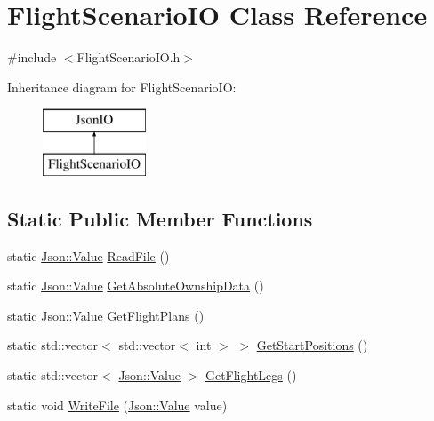\hypertarget{class_flight_scenario_i_o}{}\section{Flight\+Scenario\+IO Class Reference}
\label{class_flight_scenario_i_o}


{\ttfamily \#include $<$Flight\+Scenario\+I\+O.\+h$>$}

Inheritance diagram for Flight\+Scenario\+IO\+:\begin{figure}[H]
\begin{center}
\leavevmode
\includegraphics[height=2.000000cm]{class_flight_scenario_i_o}
\end{center}
\end{figure}
\subsection*{Static Public Member Functions}
\begin{DoxyCompactItemize}
\item 
static \hyperlink{class_json_1_1_value}{Json\+::\+Value} \hyperlink{class_flight_scenario_i_o_aecbc4f1b1b7f894e5492869b97e0fe80}{Read\+File} ()
\item 
static \hyperlink{class_json_1_1_value}{Json\+::\+Value} \hyperlink{class_flight_scenario_i_o_ac59acd7bc4300bfe2a9e89e0b5bf3552}{Get\+Absolute\+Ownship\+Data} ()
\item 
static \hyperlink{class_json_1_1_value}{Json\+::\+Value} \hyperlink{class_flight_scenario_i_o_a7754b53451b1fada9abde7fbc76d6f1c}{Get\+Flight\+Plans} ()
\item 
static std\+::vector$<$ std\+::vector$<$ int $>$ $>$ \hyperlink{class_flight_scenario_i_o_af72948757583488975e1282dfdd3e8a4}{Get\+Start\+Positions} ()
\item 
static std\+::vector$<$ \hyperlink{class_json_1_1_value}{Json\+::\+Value} $>$ \hyperlink{class_flight_scenario_i_o_a0d16fc884060e675aef902c37ee2b274}{Get\+Flight\+Legs} ()
\item 
static void \hyperlink{class_flight_scenario_i_o_ab8652a866e50bae73dd3be2cf4f92920}{Write\+File} (\hyperlink{class_json_1_1_value}{Json\+::\+Value} value)
\end{DoxyCompactItemize}
